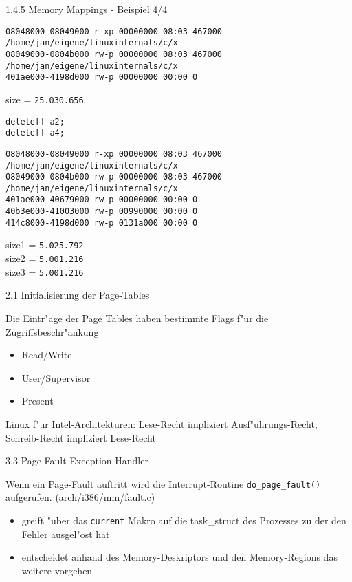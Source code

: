 \documentclass[landscape]{slides}
\begin{document}
\begin{slide}{1.4.5 Memory Mappings - Beispiel 4/4}
\small{
\begin{verbatim}
08048000-08049000 r-xp 00000000 08:03 467000     /home/jan/eigene/linuxinternals/c/x
08049000-0804b000 rw-p 00000000 08:03 467000     /home/jan/eigene/linuxinternals/c/x
401ae000-4198d000 rw-p 00000000 00:00 0
\end{verbatim}
}
size = \texttt{25.030.656}

\normalsize{
		  \texttt{delete[] a2;}\\
		  \texttt{delete[] a4;}\\
}
\small{
\begin{verbatim}
08048000-08049000 r-xp 00000000 08:03 467000     /home/jan/eigene/linuxinternals/c/x
08049000-0804b000 rw-p 00000000 08:03 467000     /home/jan/eigene/linuxinternals/c/x
401ae000-40679000 rw-p 00000000 00:00 0
40b3e000-41003000 rw-p 00990000 00:00 0
414c8000-4198d000 rw-p 0131a000 00:00 0
\end{verbatim}
}
size1 = \texttt{5.025.792}\\
size2 = \texttt{5.001.216}\\
size3 = \texttt{5.001.216}
\end{slide}
%
%
%
%
\begin{slide}{2.1 Initialisierung der Page-Tables}

Die Eintr"age der Page Tables haben bestimmte Flags f"ur die Zugriffsbeschr"ankung
\begin{itemize}
\item Read/Write
\item User/Supervisor
\item Present
\end{itemize}
Linux f"ur Intel-Architekturen: Lese-Recht impliziert Ausf"uhrungs-Recht, Schreib-Recht impliziert Lese-Recht
\end{slide}
%
%
%
\begin{slide}{3.3 Page Fault Exception Handler}

Wenn ein Page-Fault auftritt wird die Interrupt-Routine \texttt{do\_page\_fault()} aufgerufen. (arch/i386/mm/fault.c)
\begin{itemize}
\item greift "uber das \texttt{current} Makro auf die task\_struct des Prozesses zu der den Fehler ausgel"ost hat
\item entscheidet anhand des Memory-Deskriptors und den Memory-Regions das weitere vorgehen 
\end{itemize}
\end{slide}
\end{document}
